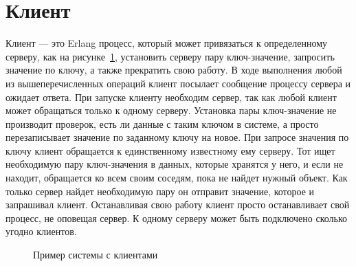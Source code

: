 	\section{Клиент}
		Клиент --- это Erlang процесс, который может привязаться к определенному серверу, как на рисунке~\ref{fig:cl}, установить серверу пару ключ-значение,
		запросить значение по ключу, а также прекратить свою работу. В ходе выполнения любой из вышеперечисленных операций клиент посылает сообщение
		процессу сервера и ожидает ответа. При запуске клиенту необходим сервер, так как любой клиент может обращаться только к одному серверу.
		Установка пары ключ-значение не производит проверок, есть ли данные с таким ключом в системе, а просто перезаписывает значение по заданному 
		ключу на новое. При запросе значения по ключу клиент обращается к единственному известному ему серверу. Тот ищет необходимую пару ключ-значения 
		в данных, которые хранятся у него, и если не находит, обращается ко всем своим соседям, пока не найдет нужный объект. Как только сервер найдет
		необходимую пару он отправит значение, которое и запрашивал клиент. Останавливая свою работу клиент просто останавливает свой процесс, не оповещая
		сервер. К одному серверу может быть подключено сколько угодно клиентов.

		\begin{figure}[H]
			\centering 
			\caption{Пример системы с клиентами} 
			\label{fig:cl}
		\end{figure}


